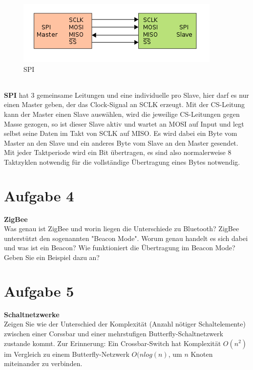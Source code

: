 \documentclass[12pt,a4paper,ngerman]{article}
\begin{document}
\begin{figure}[h!]
\vspace{-20pt}
\begin{center}
\includegraphics[scale=0.5]{figures/spi.png} 
\caption{SPI}
\end{center}
\vspace{-20pt}
\end{figure}\\
\textbf{SPI} hat 3 gemeinsame Leitungen und eine individuelle pro Slave, hier darf es nur einen Master geben, der das Clock-Signal an SCLK erzeugt. Mit der CS-Leitung kann der Master einen Slave auswählen, wird die jeweilige CS-Leitungen gegen Masse gezogen, so ist dieser Slave aktiv und wartet an MOSI auf Input und legt selbst seine Daten im Takt von SCLK auf MISO. Es wird dabei ein Byte vom Master an den Slave und ein anderes Byte vom Slave an den Master gesendet. \\
Mit jeder Taktperiode wird ein Bit übertragen, es sind also normalerweise 8 Taktzyklen notwendig für die vollständige Übertragung eines Bytes notwendig. 
\pagebreak

\section*{Aufgabe 4}


\begin{framed}
\textbf{ZigBee}\\
Was genau ist ZigBee und worin liegen die Unterschiede zu Bluetooth? ZigBee unterstützt den sogenannten "Beacon Mode". Worum genau handelt es sich dabei und was ist ein Beacon? Wie funktioniert die Übertragung im Beacon Mode? Geben Sie ein Beispiel dazu an?
\end{framed}

\pagebreak

\section*{Aufgabe 5}


\begin{framed}
\textbf{Schaltnetzwerke}\\
Zeigen Sie wie der Unterschied der Komplexität (Anzahl nötiger Schaltelemente) zwischen einer Corssbar und einer mehrstufigen Butterfly-Schaltnetzwerk zustande kommt.
Zur Erinnerung: Ein Crossbar-Switch hat Komplexität $O(n^2)$ im Vergleich zu einem Butterfly-Netzwerk $O(nlog(n)$, um $n$ Knoten miteinander zu verbinden. 
\end{framed}
\end{document}
